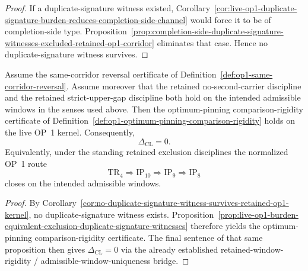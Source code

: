 \begin{proof}
If a duplicate-signature witness existed, Corollary~\ref{cor:live-op1-duplicate-signature-burden-reduces-completion-side-channel} would force it to be of completion-side type. Proposition~\ref{prop:completion-side-duplicate-signature-witnesses-excluded-retained-op1-corridor} eliminates that case. Hence no duplicate-signature witness survives.
\end{proof}

\begin{theorem}
\label{thm:closure-live-op1-kernel-standing-retained-exclusion-disciplines}
Assume the same-corridor reversal certificate of Definition~\ref{def:op1-same-corridor-reversal}. Assume moreover that the retained no-second-carrier discipline and the retained strict-upper-gap discipline both hold on the intended admissible windows in the senses used above. Then the optimum-pinning comparison-rigidity certificate of Definition~\ref{def:op1-optimum-pinning-comparison-rigidity} holds on the live OP~1 kernel. Consequently,
\[
\Delta_{\mathrm{CL}}=0.
\]
Equivalently, under the standing retained exclusion disciplines the normalized OP~1 route
\[
\mathrm{TR}_4 \Longrightarrow \mathrm{IP}_{10} \Longrightarrow \mathrm{IP}_9 \Longrightarrow \mathrm{IP}_8
\]
closes on the intended admissible windows.
\end{theorem}

\begin{proof}
By Corollary~\ref{cor:no-duplicate-signature-witness-survives-retained-op1-kernel}, no duplicate-signature witness exists. Proposition~\ref{prop:live-op1-burden-equivalent-exclusion-duplicate-signature-witnesses} therefore yields the optimum-pinning comparison-rigidity certificate. The final sentence of that same proposition then gives \(\Delta_{\mathrm{CL}}=0\) via the already established retained-window-rigidity / admissible-window-uniqueness bridge.
\end{proof}

